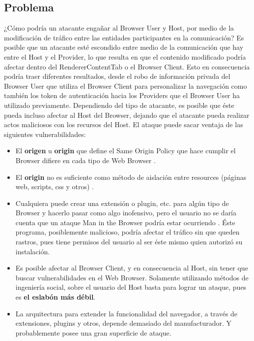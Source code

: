 \subsection{Problema}
¿Cómo podría un atacante engañar al Browser User y Host, por medio de la modificación de tráfico entre las entidades participantes en la comunicación? Es posible que un atacante esté escondido entre medio de la comunicación que hay entre el Host y el Provider, lo que resulta en que el contenido modificado podría afectar dentro del RendererContentTab o el Browser Client. Esto en consecuencia podría traer diferentes resultados, desde el robo de información privada del Browser User que utiliza el Browser Client para personalizar la navegación como también los token de autenticación hacia los Providers que el Browser User ha utilizado previamente. Dependiendo del tipo de atacante, es posible que éste pueda incluso afectar al Host del Browser, dejando que el atacante pueda realizar actos maliciosos con los recursos del Host. 
El ataque puede sacar ventaja de las siguientes vulnerabilidades:
\begin{itemize}
	\item El \textbf{origen} u \textbf{origin} que define el Same Origin Policy que hace cumplir el Browser difiere en cada tipo de Web Browser \cite{W3C-SOP,Reis2009, Jackson2008, Crowley2010, Paola2006}.
	\item El \textbf{origin} no es suficiente como método de aislación entre resources (páginas web, scripts, css y otros) \cite{Silic2010, Barth2009, Yason, Liu2012}.
	\item Cualquiera puede crear una extensión o plugin, etc. para algún tipo de Browser y hacerlo pasar como algo inofensivo, pero el usuario no se daría cuenta que un ataque Man in the Browser podría estar ocurriendo \cite{Dougan2012,Utakrit2009,Liu2012,Barth2010}.  Éste programa, posiblemente malicioso, podría afectar el tráfico sin que queden rastros, pues tiene permisos del usuario al ser éste mismo quien autorizó su instalación.
	\item Es posible afectar al Browser Client, y en consecuencia al Host, sin tener que buscar vulnerabilidades en el Web Browser. Solamente utilizando métodos de ingeniería social, sobre el usuario del Host basta para lograr un ataque, pues es \textbf{el eslabón más débil}.
	\item La arquitectura para extender la funcionalidad del navegador, a través de extensiones, plugins y otros, depende demasiado del manufacturador. Y probablemente posee una gran superficie de ataque.
\end{itemize}

